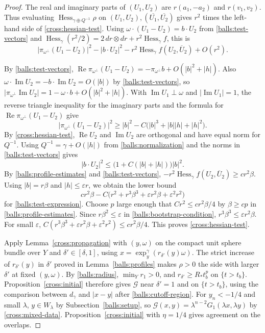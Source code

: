 \documentclass[11pt,a4paper]{article}
\theoremstyle{definition}
\theoremstyle{remark}
\numberwithin{equation}{section}
\begin{document}
\begin{proof}
The real and imaginary parts of $(U_1,U_2)$ are $r(a_1,-a_2)$ and
$r(v_1,v_2)$. Thus evaluating
$\operatorname{Hess}_{\gamma\oplus Q^{-1}}\rho$ on
$(U_1,U_2),(\overline{U_1},\overline{U_2})$ gives $r^2$ times the
left-hand side of \eqref{cross:hessian-test}.
Using $\omega\cdot(U_1-U_2)=b\cdot U_2$ from \eqref{balls:test-vectors}
and $\operatorname{Hess}_\gamma(r^2/2)
=2\,dr\otimes dr+r^2\operatorname{Hess}_\gamma f$, this is
\begin{equation}\label{balls:test-expression}
 |\pi_{\omega^\perp}(U_1-U_2)|^2-|b\cdot U_2|^2
      -r^2\operatorname{Hess}_\gamma f(U_2,\overline U_2)+O(r^2).
\end{equation}

By \eqref{balls:test-vectors},
$\operatorname{Re}\pi_{\omega^\perp}(U_1-U_2)
=-\pi_{\omega^\perp}b+O(|b|^2+|h|)$.
Also $\omega\cdot\operatorname{Im}U_2=-b\cdot\operatorname{Im}U_2
=O(|b|)$ by \eqref{balls:test-vectors}, so
$|\pi_{\omega^\perp}\operatorname{Im}U_2|
=1-\omega\cdot b+O(|b|^2+|h|)$.
With $\operatorname{Im}U_1\perp\omega$ and $|\operatorname{Im}U_1|=1$,
the reverse triangle inequality for the imaginary parts and the
formula for $\operatorname{Re}\pi_{\omega^\perp}(U_1-U_2)$ give
\[
 |\pi_{\omega^\perp}(U_1-U_2)|^2
 \geq |b|^2-C\bigl(|b|^3+|b||h|+|h|^2\bigr).
\]
By \eqref{cross:hessian-test}, $\operatorname{Re}U_2$ and
$\operatorname{Im}U_2$ are orthogonal and have equal norm for $Q^{-1}$.
Using $Q^{-1}=\gamma+O(|h|)$ from \eqref{balls:normalization} and the
norms in \eqref{balls:test-vectors} gives
\[
 |b\cdot U_2|^2\leq
       \bigl(1+C(|b|+|h|)\bigr)|b|^2.
\]
By \eqref{balls:profile-estimates} and \eqref{balls:test-vectors},
$-r^2\operatorname{Hess}_\gamma f(U_2,\overline U_2)\geq cr^2\beta$.
Using $|b|=r\beta$ and $|h|\leq\varepsilon r$, we obtain the lower bound
\[
 c r^2\beta
  -C\bigl(r^2+r^3\beta^3+\varepsilon r^2\beta
                       +\varepsilon^2r^2\bigr)
\]
for \eqref{balls:test-expression}. Choose $p$ large enough that
$Cr^2\leq cr^2\beta/4$ by $\beta\geq cp$ in
\eqref{balls:profile-estimates}. Since $r\beta^2\leq\varepsilon$ in
\eqref{balls:bootstrap-condition}, $r^3\beta^3\leq\varepsilon r^2\beta$.
For small $\varepsilon$,
$C(r^3\beta^3+\varepsilon r^2\beta+\varepsilon^2r^2)\leq cr^2\beta/4$.
This proves \eqref{cross:hessian-test}.

Apply Lemma~\ref{cross:propagation} with $(y,\omega)$ on the compact
unit sphere bundle over $Y$ and $\delta'\in[\delta,1]$, using
$x=\exp_y^\gamma(r_{\delta'}(y)\omega)$. The strict increase of
$r_{\delta'}(y)$ in $\delta'$ proved in Lemma~\ref{balls:profiles}
makes $\rho>0$ the side with larger $\delta'$ at fixed $(y,\omega)$.
By \eqref{balls:radius}, $\min_Y r_1>0$, and $r_{\delta'}\geq R_*t_b^p$
on $\{t>t_b\}$. Proposition~\ref{cross:initial} therefore gives
$\mathcal G$ near $\delta'=1$ and on $\{t>t_b\}$, using the comparison
between $d_\gamma$ and $|x-y|$ after \eqref{balls:cutoff-region}.
For $y_n<-1/4$ and small $\lambda$, $y\in W_\lambda$ by
Subsection~\ref{balls:setup}, so
$\mathcal G(x,y)=\lambda^{n-2}G_1(\lambda x,\lambda y)$ by
\eqref{cross:mixed-data}. Proposition~\ref{cross:initial} with
$\eta=1/4$ gives agreement on the overlaps.


\end{proof}
\end{document}
